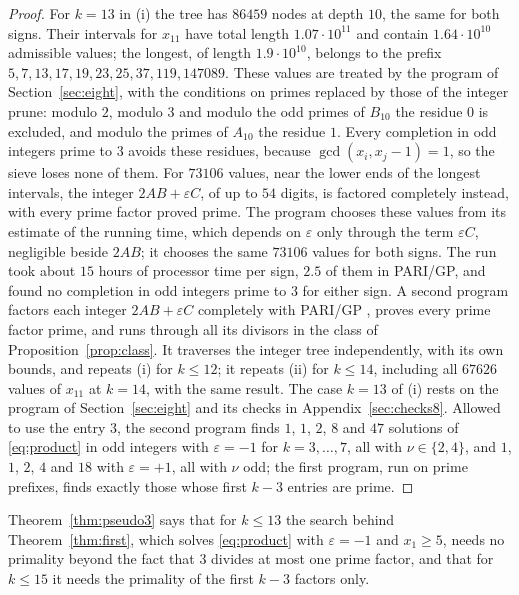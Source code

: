 \documentclass[11pt,reqno]{amsart}
\numberwithin{equation}{section}
\theoremstyle{plain}
\theoremstyle{definition}
\theoremstyle{remark}
\begin{document}
\begin{proof}
For $k=13$ in (i) the tree has $86459$ nodes at depth $10$, the same
for both signs. Their intervals for $x_{11}$ have total length
$1.07\cdot10^{11}$ and contain $1.64\cdot10^{10}$ admissible values;
the longest, of length $1.9\cdot10^{10}$, belongs to the prefix
$5,7,13,17,19,23,25,37,119,147089$. These values are treated by the
program of Section~\ref{sec:eight}, with the conditions on primes
replaced by those of the integer prune: modulo $2$, modulo $3$ and
modulo the odd primes of $B_{10}$ the residue $0$ is excluded, and
modulo the primes of $A_{10}$ the residue $1$. Every completion in odd
integers prime to $3$ avoids these residues, because
$\gcd(x_i,x_j-1)=1$, so the sieve loses none of them. For $73106$
values, near the lower ends of the longest intervals, the integer
$2AB+\varepsilon C$, of up to $54$ digits, is factored completely
instead, with every prime factor proved prime. The program chooses
these values from its estimate of the running time, which depends on
$\varepsilon$ only through the term $\varepsilon C$, negligible beside
$2AB$; it chooses the same $73106$ values for both signs. The run took
about $15$ hours of processor time per sign, $2.5$ of them in PARI/GP,
and found no completion in odd integers prime to $3$ for either sign.
A second program factors each integer $2AB+\varepsilon C$ completely
with PARI/GP \cite{PARI}, proves every prime factor prime, and runs through all its
divisors in the class of Proposition~\ref{prop:class}. It traverses
the integer tree independently, with its own bounds, and repeats (i)
for $k\le12$; it repeats (ii) for $k\le14$, including all $67626$ values of $x_{11}$
at $k=14$, with the same result. The case $k=13$ of (i) rests on the
program of Section~\ref{sec:eight} and its checks in
Appendix~\ref{sec:checks8}. Allowed to use the entry $3$, the
second program finds $1$, $1$, $2$, $8$ and $47$ solutions of
\eqref{eq:product} in odd integers with $\varepsilon=-1$ for
$k=3,\dots,7$, all with $\nu\in\{2,4\}$, and $1$, $1$, $2$, $4$ and $18$
with $\varepsilon=+1$, all with $\nu$ odd; the first program, run on
prime prefixes, finds exactly those whose first $k-3$ entries are
prime.
\end{proof}

Theorem~\ref{thm:pseudo3} says that for $k\le13$ the search behind
Theorem~\ref{thm:first}, which solves \eqref{eq:product} with
$\varepsilon=-1$ and $x_1\ge5$, needs no primality beyond the fact
that $3$ divides at most one prime factor, and that for $k\le15$ it
needs the primality of the first $k-3$ factors only.
\end{document}
